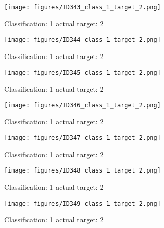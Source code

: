 \begin{figure}[h!]
\begin{center}
\texttt{[image: figures/ID343\_class\_1\_target\_2.png]}
\end{center}
\caption{ Classification: 1 actual target: 2}
\label{fig:ID343_class_1_target_2}
\end{figure}
\begin{figure}[h!]
\begin{center}
\texttt{[image: figures/ID344\_class\_1\_target\_2.png]}
\end{center}
\caption{ Classification: 1 actual target: 2}
\label{fig:ID344_class_1_target_2}
\end{figure}
\begin{figure}[h!]
\begin{center}
\texttt{[image: figures/ID345\_class\_1\_target\_2.png]}
\end{center}
\caption{ Classification: 1 actual target: 2}
\label{fig:ID345_class_1_target_2}
\end{figure}
\begin{figure}[h!]
\begin{center}
\texttt{[image: figures/ID346\_class\_1\_target\_2.png]}
\end{center}
\caption{ Classification: 1 actual target: 2}
\label{fig:ID346_class_1_target_2}
\end{figure}
\begin{figure}[h!]
\begin{center}
\texttt{[image: figures/ID347\_class\_1\_target\_2.png]}
\end{center}
\caption{ Classification: 1 actual target: 2}
\label{fig:ID347_class_1_target_2}
\end{figure}
\begin{figure}[h!]
\begin{center}
\texttt{[image: figures/ID348\_class\_1\_target\_2.png]}
\end{center}
\caption{ Classification: 1 actual target: 2}
\label{fig:ID348_class_1_target_2}
\end{figure}
\begin{figure}[h!]
\begin{center}
\texttt{[image: figures/ID349\_class\_1\_target\_2.png]}
\end{center}
\caption{ Classification: 1 actual target: 2}
\label{fig:ID349_class_1_target_2}
\end{figure}
